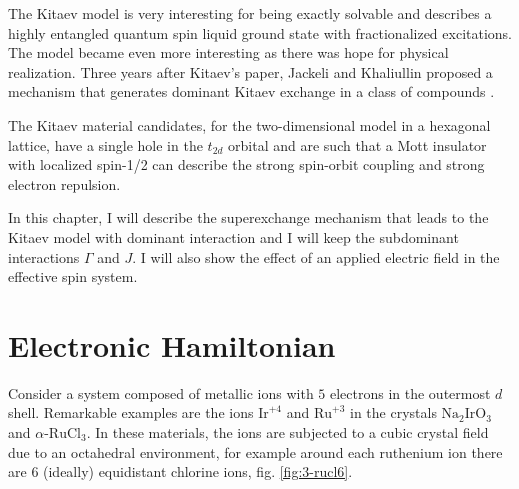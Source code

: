 

The Kitaev model is very interesting for being exactly solvable and describes a highly entangled quantum spin liquid ground state with fractionalized excitations.
The model became even more interesting as there was hope for physical realization.
Three years after Kitaev's paper\cite{Kitaev2006}, Jackeli and Khaliullin proposed a mechanism that generates dominant Kitaev exchange in a class of compounds \cite{Jackeli2009}.


The Kitaev material candidates, for the two-dimensional model in a hexagonal lattice,  have a single hole in the $t_{2d}$ orbital and are such that a Mott insulator with localized spin-1/2 can describe the strong spin-orbit coupling and strong electron repulsion.

In this chapter, I will describe the superexchange mechanism that leads to the Kitaev model with dominant interaction and I will keep the subdominant interactions $\Gamma$ and $J$. I will also show the effect of an applied electric field in the effective spin system.




\section{Electronic Hamiltonian}


Consider a system composed of metallic ions with $5$ electrons in the outermost $d$ shell. Remarkable examples are the ions $\mathrm{Ir}^{+4}$ and $\mathrm{Ru}^{+3}$   in the crystals $\text{Na}_2\text{IrO}_3$ and $\alpha\text{-RuCl}_3$.  In these materials, the ions are subjected to a cubic crystal field due to an octahedral environment, for example around each ruthenium ion there are $6$ (ideally) equidistant chlorine ions, fig. \ref{fig:3-rucl6}. %




